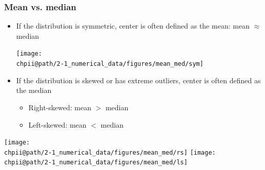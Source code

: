 \documentclass[slidestop,compress,mathserif]{beamer}
\makeatletter
\newcommand{\soln}[1]{\textit{#1}}
\def\chpii@path{../../Chp 2}
\makeatother
\begin{document}

\begin{frame}
\frametitle{Mean vs. median}

\begin{itemize}

\item If the distribution is symmetric, center is often defined as the mean: mean $\approx$ median

\begin{center}
\texttt{[image: \\chpii@path/2-1\_numerical\_data/figures/mean\_med/sym]}
\end{center}

\item If the distribution is skewed or has extreme outliers, center is often defined as the median
\begin{itemize}
\item Right-skewed: mean $>$ median
\item Left-skewed: mean $<$ median \\
\end{itemize}

\end{itemize}

\begin{center}
\texttt{[image: \\chpii@path/2-1\_numerical\_data/figures/mean\_med/rs]}
\texttt{[image: \\chpii@path/2-1\_numerical\_data/figures/mean\_med/ls]}\\
\end{center}

\end{frame}





\end{document}
